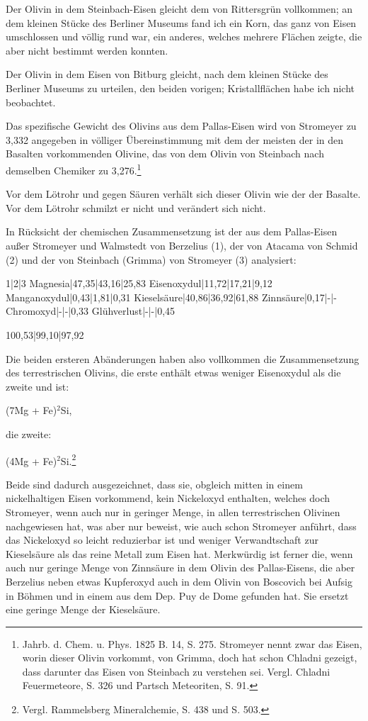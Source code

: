 \documentclass[a4paper, 11pt, oneside]{article}
\begin{document}
Der Olivin in dem Steinbach-Eisen gleicht dem von Rittersgrün vollkommen; an dem kleinen Stücke des Berliner Museums fand ich ein Korn, das ganz von Eisen umschlossen und völlig rund war, ein anderes, welches mehrere Flächen zeigte, die aber nicht bestimmt werden konnten.

Der Olivin in dem Eisen von Bitburg gleicht, nach dem kleinen Stücke des Berliner Museums zu urteilen, den beiden vorigen; Kristallflächen habe ich nicht beobachtet.

Das spezifische Gewicht des Olivins aus dem Pallas-Eisen wird von Stromeyer zu 3,332 angegeben in völliger Übereinstimmung mit dem der meisten der in den Basalten vorkommenden Olivine, das von dem Olivin von Steinbach nach demselben Chemiker zu 3,276.\footnote{Jahrb. d. Chem. u. Phys. 1825 B. 14, S. 275. Stromeyer nennt zwar das Eisen, worin dieser Olivin vorkommt, von Grimma, doch hat schon Chladni gezeigt, dass darunter das Eisen von Steinbach zu verstehen sei. Vergl. Chladni Feuermeteore, S. 326 und Partsch Meteoriten, S. 91.}

Vor dem Lötrohr und gegen Säuren verhält sich dieser Olivin wie der der Basalte. Vor dem Lötrohr schmilzt er nicht und verändert sich nicht.

In Rücksicht der chemischen Zusammensetzung ist der aus dem Pallas-Eisen außer Stromeyer und Walmstedt von Berzelius (1), der von Atacama von Schmid (2) und der von Steinbach (Grimma) von Stromeyer (3) analysiert:

 1|2|3  
Magnesia|47,35|43,16|25,83  
Eisenoxydul|11,72|17,21|9,12  
Manganoxydul|0,43|1,81|0,31  
Kieselsäure|40,86|36,92|61,88  
Zinnsäure|0,17|-|-  
Chromoxyd|-|-|0,33  
Glühverlust|-|-|0,45  

100,53|99,10|97,92

Die beiden ersteren Abänderungen haben also vollkommen die Zusammensetzung des terrestrischen Olivins, die erste enthält etwas weniger Eisenoxydul als die zweite und ist:

(7Mg + Fe)$^{2}$Si,

die zweite:

(4Mg + Fe)$^{2}$Si.\footnote{Vergl. Rammelsberg Mineralchemie, S. 438 und S. 503.}

Beide sind dadurch ausgezeichnet, dass sie, obgleich mitten in einem nickelhaltigen Eisen vorkommend, kein Nickeloxyd enthalten, welches doch Stromeyer, wenn auch nur in geringer Menge, in allen terrestrischen Olivinen nachgewiesen hat, was aber nur beweist, wie auch schon Stromeyer anführt, dass das Nickeloxyd so leicht reduzierbar ist und weniger Verwandtschaft zur Kieselsäure als das reine Metall zum Eisen hat. Merkwürdig ist ferner die, wenn auch nur geringe Menge von Zinnsäure in dem Olivin des Pallas-Eisens, die aber Berzelius neben etwas Kupferoxyd auch in dem Olivin von Boscovich bei Aufsig in Böhmen und in einem aus dem Dep. Puy de Dome gefunden hat. Sie ersetzt eine geringe Menge der Kieselsäure.
\end{document}
